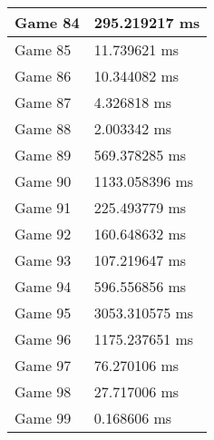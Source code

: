 \begin{tabular}{|l|l|}
	Game 84 & 295.219217 ms \\ \hline
	Game 85 & 11.739621 ms \\ \hline
	Game 86 & 10.344082 ms \\ \hline
	Game 87 & 4.326818 ms \\ \hline
	Game 88 & 2.003342 ms \\ \hline
	Game 89 & 569.378285 ms \\ \hline
	Game 90 & 1133.058396 ms \\ \hline
	Game 91 & 225.493779 ms \\ \hline
	Game 92 & 160.648632 ms \\ \hline
	Game 93 & 107.219647 ms \\ \hline
	Game 94 & 596.556856 ms \\ \hline
	Game 95 & 3053.310575 ms \\ \hline
	Game 96 & 1175.237651 ms \\ \hline
	Game 97 & 76.270106 ms \\ \hline
	Game 98 & 27.717006 ms \\ \hline
	Game 99 & 0.168606 ms \\ \hline
\end{tabular}

